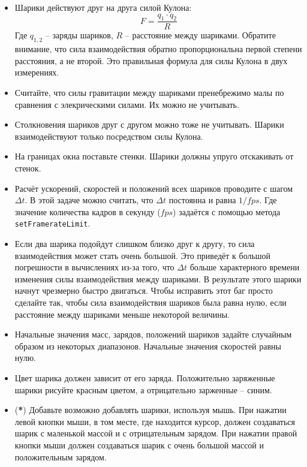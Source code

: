 \documentclass{article}
\begin{document}
\begin{itemize}
\item Шарики действуют друг на друга силой Кулона:
$$
F  = \frac{q_1 \cdot q_2}{R}
$$
Где $q_{1,2}$ -- заряды шариков, $R$ -- расстояние между шариками. Обратите внимание, что сила взаимодействия обратно пропорциональна первой степени расстояния, а не второй. Это правильная формула для силы Кулона в двух измерениях.

\item Считайте, что силы гравитации между шариками пренебрежимо малы по сравнения с элекрическими силами. Их можно не учитывать.

\item Столкновения шариков друг с другом можно тоже не учитывать. Шарики взаимодействуют только посредством силы Кулона.

\item На границах окна поставьте стенки. Шарики должны упруго отскакивать от стенок.

\item Расчёт ускорений, скоростей и положений всех шариков проводите с шагом $\Delta t$. В этой задаче можно считать, что $\Delta t$ постоянна и равна $1 / fps$. Где значение количества кадров в секунду ($fps$) задаётся с помощью метода \texttt{setFramerateLimit}. 

\item Если два шарика подойдут слишком близко друг к другу, то сила взаимодействия может стать очень большой. Это приведёт к большой погрешности в вычислениях из-за того, что $\Delta t$ больше характерного времени изменения силы взаимодействия между шариками. В результате этого шарики начнут чрезмерно быстро двигаться. Чтобы исправить этот баг просто сделайте так, чтобы сила взаимодействия шариков была равна нулю, если расстояние между шариками меньше некоторой величины.

\item Начальные значения масс, зарядов, положений шариков задайте случайным образом из некоторых диапазонов. Начальные значения скоростей равны нулю.

\item Цвет шарика должен зависит от его заряда. Положительно заряженные шарики рисуйте красным цветом, а отрицательно зарженные -- синим.

\item (\textbf{*}) Добавьте возможно добавлять шарики, используя мышь. При нажатии левой кнопки мыши, в том месте, где находится курсор, должен создаваться шарик с маленькой массой и с отрицательным зарядом. При нажатии правой кнопки мыши должен создаваться шарик с очень большой  массой и положительным зарядом.
\end{itemize}
\end{document}
